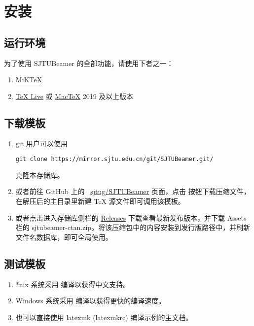 \documentclass[
    UTF8,
    heading=true,
    12pt,
    a4paper
]{ctexrep}
\def\themename{\textsf{SJTUBeamer}}
\begin{document}
\chapter{安装}

\section{运行环境}

为了使用 \themename{} 的全部功能，请使用下者之一：
\begin{enumerate}
  \item \href{https://mirrors.sjtug.sjtu.edu.cn/ctan/systems/win32/miktex/setup/windows-x64/}{MiK\TeX{}}
  \item \href{https://mirrors.sjtug.sjtu.edu.cn/ctan/systems/texlive/Images/}{\TeX{} Live} 或 \href{https://mirrors.sjtug.sjtu.edu.cn/ctan/systems/mac/mactex/}{Mac\TeX{}} 2019 及以上版本
\end{enumerate}

\section{下载模板}

\begin{enumerate}
  \item git 用户可以使用
        \begin{verbatim}git clone https://mirror.sjtu.edu.cn/git/SJTUBeamer.git/\end{verbatim}
        克隆本存储库。
  \item 或者前往 GitHub 上的 \faGithub{}~\href{https://github.com/sjtug/SJTUBeamer}{sjtug/SJTUBeamer} 页面，点击  按钮下载压缩文件，在解压后的主目录里新建 \TeX{} 源文件即可调用该模板。
  \item 或者点击进入存储库侧栏的 \href{https://github.com/sjtug/SJTUBeamer/releases}{\textsf{Releases}} 下载查看最新发布版本，并下载 \textsf{Assets} 栏的 \textsf{sjtubeamer-ctan.zip}。将该压缩包中的内容安装到发行版路径中，并刷新文件名数据库，即可全局使用。
\end{enumerate}

\section{测试模板}

\begin{enumerate}
  \item[ \faApple{} \faLinux] *nix 系统采用  编译以获得中文支持。
  \item[ \faWindows] Windows 系统采用  编译以获得更快的编译速度。
  \item[\faWrench] 也可以直接使用 \textsf{latexmk (latexmkrc)} 编译示例的主文档。
\end{enumerate}
\end{document}
